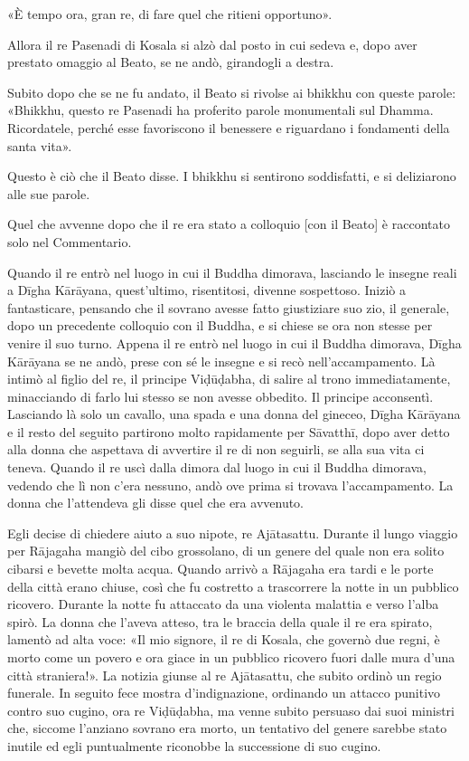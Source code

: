 «È tempo ora, gran re, di fare quel che ritieni opportuno».


Allora il re Pasenadi di Kosala si alzò dal posto in cui sedeva e, dopo
aver prestato omaggio al Beato, se ne andò, girandogli a destra.


Subito dopo che se ne fu andato, il Beato si rivolse ai bhikkhu con
queste parole: «Bhikkhu, questo re Pasenadi ha proferito parole
monumentali sul Dhamma. Ricordatele, perché esse favoriscono il
benessere e riguardano i fondamenti della santa vita».


Questo è ciò che il Beato disse. I bhikkhu si sentirono soddisfatti, e
si deliziarono alle sue parole.




 Quel che avvenne dopo che il re era stato a colloquio
[con il Beato] è raccontato solo nel Commentario.


 Quando il re entrò nel luogo in cui il Buddha
dimorava, lasciando le insegne reali a Dīgha Kārāyana, quest’ultimo,
risentitosi, divenne sospettoso. Iniziò a fantasticare, pensando che il
sovrano avesse fatto giustiziare suo zio, il generale, dopo un
precedente colloquio con il Buddha, e si chiese se ora non stesse per
venire il suo turno. Appena il re entrò nel luogo in cui il Buddha
dimorava, Dīgha Kārāyana se ne andò, prese con sé le insegne e si recò
nell’accampamento. Là intimò al figlio del re, il principe Viḍūḍabha, di
salire al trono immediatamente, minacciando di farlo lui stesso se non
avesse obbedito. Il principe acconsentì. Lasciando là solo un cavallo,
una spada e una donna del gineceo, Dīgha Kārāyana e il resto del seguito
partirono molto rapidamente per Sāvatthī, dopo aver detto alla donna che
aspettava di avvertire il re di non seguirli, se alla sua vita ci
teneva. Quando il re uscì dalla dimora dal luogo in cui il Buddha
dimorava, vedendo che lì non c’era nessuno, andò ove prima si trovava
l’accampamento. La donna che l’attendeva gli disse quel che era
avvenuto.


Egli decise di chiedere aiuto a suo nipote, re Ajātasattu. Durante il
lungo viaggio per Rājagaha mangiò del cibo grossolano, di un genere
del quale non era solito cibarsi e bevette molta acqua. Quando arrivò a
Rājagaha era tardi e le porte della città erano chiuse, così che fu
costretto a trascorrere la notte in un pubblico ricovero. Durante la
notte fu attaccato da una violenta malattia e verso l’alba spirò. La
donna che l’aveva atteso, tra le braccia della quale il re era spirato,
lamentò ad alta voce: «Il mio signore, il re di Kosala, che governò due
regni, è morto come un povero e ora giace in un pubblico ricovero fuori
dalle mura d’una città straniera!». La notizia giunse al re Ajātasattu,
che subito ordinò un regio funerale. In seguito fece mostra
d’indignazione, ordinando un attacco punitivo contro suo cugino, ora re
Viḍūḍabha, ma venne subito persuaso dai suoi ministri che, siccome
l’anziano sovrano era morto, un tentativo del genere sarebbe stato
inutile ed egli puntualmente riconobbe la successione di suo cugino.



